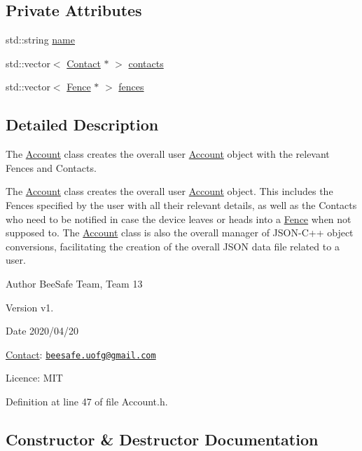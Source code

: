 \subsection*{Private Attributes}
\begin{DoxyCompactItemize}
\item 
std\+::string \hyperlink{class_account_a586e2c3461c5231eacf7c96851024a75}{name}
\item 
std\+::vector$<$ \hyperlink{class_contact}{Contact} $\ast$ $>$ \hyperlink{class_account_aa4f77abd7c44f2a70b0cff8088e3491f}{contacts}
\item 
std\+::vector$<$ \hyperlink{class_fence}{Fence} $\ast$ $>$ \hyperlink{class_account_ad92a9e8008371f34da06cd416a716fa1}{fences}
\end{DoxyCompactItemize}


\subsection{Detailed Description}
The \hyperlink{class_account}{Account} class creates the overall user \hyperlink{class_account}{Account} object with the relevant Fences and Contacts. 

The \hyperlink{class_account}{Account} class creates the overall user \hyperlink{class_account}{Account} object. This includes the Fences specified by the user with all their relevant details, as well as the Contacts who need to be notified in case the device leaves or heads into a \hyperlink{class_fence}{Fence} when not supposed to. The \hyperlink{class_account}{Account} class is also the overall manager of J\+S\+O\+N-\/\+C++ object conversions, facilitating the creation of the overall J\+S\+ON data file related to a user.

\begin{DoxyAuthor}{Author}
Bee\+Safe Team, Team 13
\end{DoxyAuthor}
\begin{DoxyVersion}{Version}
v1.
\end{DoxyVersion}
\begin{DoxyDate}{Date}
2020/04/20
\end{DoxyDate}
\hyperlink{class_contact}{Contact}\+: \href{mailto:beesafe.uofg@gmail.com}{\tt beesafe.\+uofg@gmail.\+com}

Licence\+: M\+IT 

Definition at line 47 of file Account.\+h.



\subsection{Constructor \& Destructor Documentation}
\mbox{\label{class_account_a14f13a7a2e1d69d4b78c804603d69e1b}} 

